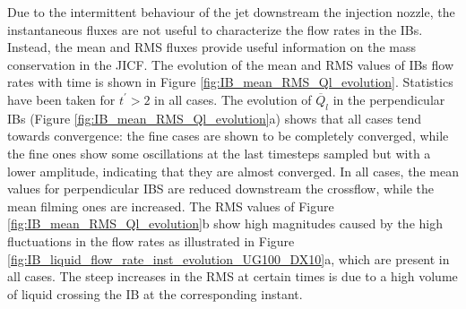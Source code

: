 Due to the intermittent behaviour of the jet downstream the injection nozzle, the instantaneous fluxes are not useful to characterize the flow rates in the IBs. Instead, the mean and RMS fluxes provide useful information on the mass conservation in the JICF. The evolution of the mean and RMS values of IBs flow rates with time is shown in Figure \ref{fig:IB_mean_RMS_Ql_evolution}. Statistics have been taken for $t^{\prime} > 2$ in all cases. The evolution of $\overline{Q}_l$ in the perpendicular IBs (Figure \ref{fig:IB_mean_RMS_Ql_evolution}a) shows that all cases tend towards convergence: the fine cases are shown to be completely converged, while the fine ones show some oscillations at the last timesteps sampled but with a lower amplitude, indicating that they are almost converged. In all cases, the mean values for perpendicular IBS are reduced downstream the crossflow, while the mean filming ones are increased. The RMS values of Figure \ref{fig:IB_mean_RMS_Ql_evolution}b show high magnitudes caused by the high fluctuations in the flow rates as illustrated in Figure \ref{fig:IB_liquid_flow_rate_inst_evolution_UG100_DX10}a, which are present in all cases. The steep increases in the RMS at certain times is due to a high volume of liquid crossing the IB at the corresponding instant.%


\clearpage


